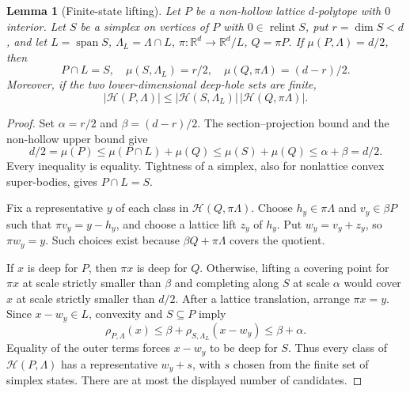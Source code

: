 \documentclass[11pt,a4paper]{article}
\newtheorem{lemma}[theorem]{Lemma}
\theoremstyle{remark}\newtheorem{remark}[theorem]{Remark}
\begin{document}
\begin{lemma}[Finite-state lifting]\label{ce:lifting}
Let $P$ be a non-hollow lattice $d$-polytope with $0$ interior.
Let $S$ be a simplex on vertices of $P$ with
$0\in\operatorname{relint}S$, put $r=\dim S<d$, and let
$L=\operatorname{span}S$, $\Lambda_L=\Lambda\cap L$,
$\pi:\mathbb R^d\to\mathbb R^d/L$, $Q=\pi P$.
If $\mu(P,\Lambda)=d/2$, then
\[
 P\cap L=S,\quad \mu(S,\Lambda_L)=r/2,\quad
 \mu(Q,\pi\Lambda)=(d-r)/2.
\]
Moreover, if the two lower-dimensional deep-hole sets are finite,
\[
 |\mathcal H(P,\Lambda)|
 \le |\mathcal H(S,\Lambda_L)|\,
       |\mathcal H(Q,\pi\Lambda)|.
\]
\end{lemma}
\begin{proof}
Set $\alpha=r/2$ and $\beta=(d-r)/2$. The section--projection
bound and the non-hollow upper bound give
\[
 d/2=\mu(P)\le\mu(P\cap L)+\mu(Q)
 \le\mu(S)+\mu(Q)\le\alpha+\beta=d/2.
\]
Every inequality is equality. Tightness of a simplex, also for
nonlattice convex super-bodies, gives $P\cap L=S$.

Fix a representative $y$ of each class in $\mathcal H(Q,\pi\Lambda)$.
Choose $h_y\in\pi\Lambda$ and $v_y\in\beta P$ such that
$\pi v_y=y-h_y$, and choose a lattice lift $z_y$ of $h_y$.
Put $w_y=v_y+z_y$, so $\pi w_y=y$. Such choices exist because
$\beta Q+\pi\Lambda$ covers the quotient.

If $x$ is deep for $P$, then $\pi x$ is deep for $Q$. Otherwise,
lifting a covering point for $\pi x$ at scale strictly smaller
than $\beta$ and completing along $S$ at scale $\alpha$ would
cover $x$ at scale strictly smaller than $d/2$.
After a lattice translation, arrange $\pi x=y$. Since
$x-w_y\in L$, convexity and $S\subseteq P$ imply
\[
 \rho_{P,\Lambda}(x)
 \le\beta+\rho_{S,\Lambda_L}(x-w_y)
 \le\beta+\alpha.
\]
Equality of the outer terms forces $x-w_y$ to be deep for $S$.
Thus every class of $\mathcal H(P,\Lambda)$ has a representative
$w_y+s$, with $s$ chosen from the finite set of simplex states.
There are at most the displayed number of candidates.
\end{proof}
\end{document}
